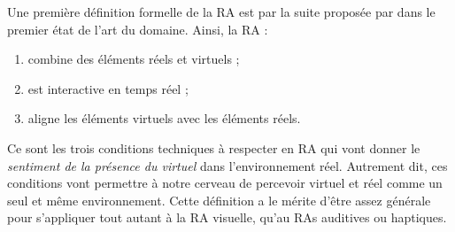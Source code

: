 
Une première définition formelle de la RA est par la suite proposée par \cite{Azuma1997} dans le premier état de l'art du domaine. Ainsi, la RA :
\begin{enumerate}
  \item combine des éléments réels et virtuels ;
  \item est interactive en temps réel ;
  \item aligne les éléments virtuels avec les éléments réels.
\end{enumerate}
\medskip

Ce sont les trois conditions techniques à respecter en RA qui vont donner le \emph{sentiment de la présence du virtuel} dans l'environnement réel. Autrement dit, ces conditions vont permettre à notre cerveau de percevoir virtuel et réel comme un seul et même environnement. Cette définition a le mérite d'être assez générale pour s'appliquer tout autant à la RA visuelle, qu'au RAs auditives ou haptiques.



